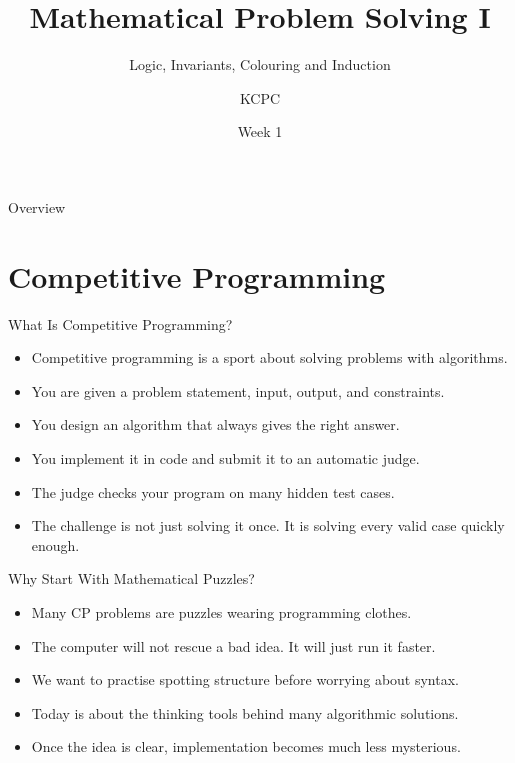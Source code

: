 \documentclass{beamer}
\title{Mathematical Problem Solving I}
\subtitle{Logic, Invariants, Colouring and Induction}
\author{KCPC}
\date{Week 1}
\begin{document}
\begin{frame}
    \titlepage
\end{frame}

\begin{frame}{Overview}
    \tableofcontents
\end{frame}

\section{Competitive Programming}

\begin{frame}{What Is Competitive Programming?}
    \pause
    \begin{itemize}
        \item Competitive programming is a sport about solving problems
            with algorithms.
        \item You are given a problem statement, input, output, and constraints.
        \item You design an algorithm that always gives the right answer.
        \item You implement it in code and submit it to an automatic judge.
        \item The judge checks your program on many hidden test cases.
        \item The challenge is not just solving it once. It is solving
            every valid case quickly enough.
    \end{itemize}
\end{frame}

\begin{frame}{Why Start With Mathematical Puzzles?}
    \pause
    \begin{itemize}
        \item Many CP problems are puzzles wearing programming clothes.
        \item The computer will not rescue a bad idea. It will just
            run it faster.
        \item We want to practise spotting structure before worrying
            about syntax.
        \item Today is about the thinking tools behind many
            algorithmic solutions.
        \item Once the idea is clear, implementation becomes much
            less mysterious.
    \end{itemize}
\end{frame}
\end{document}
